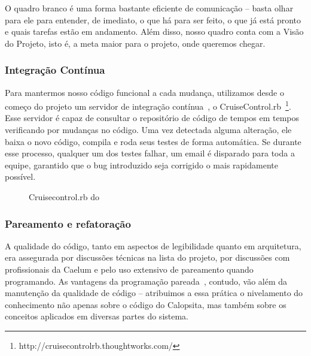 O quadro branco é uma forma bastante eficiente de comunicação -- basta olhar para ele para entender, de imediato, o que há para ser feito, o que já está pronto e quais tarefas estão em andamento. Além disso, nosso quadro conta com a Visão do Projeto, isto é, a meta maior para o projeto, onde queremos chegar.

\subsubsection*{Integração Contínua}

Para mantermos nosso código funcional a cada mudança, utilizamos desde o começo do projeto um servidor de integração contínua~\cite{ci}, o CruiseControl.rb~\footnote{http://cruisecontrolrb.thoughtworks.com/}. Esse servidor é capaz de consultar o repositório de código de tempos em tempos verificando por mudanças no código. Uma vez detectada alguma alteração, ele baixa o novo código, compila e roda seus testes de forma automática. Se durante esse processo, qualquer um dos testes falhar, um email é disparado para toda a equipe, garantido que o bug introduzido seja corrigido o mais rapidamente possível.

\begin{figure}[H]
  \centering
  \caption{Cruisecontrol.rb do \calopsita}
\end{figure}

\subsubsection*{Pareamento e refatoração}

A qualidade do código, tanto em aspectos de legibilidade quanto em arquitetura, era assegurada por discussões técnicas na lista do projeto, por discussões com profissionais da Caelum e pelo uso extensivo de pareamento quando programando. As vantagens da programação pareada~\cite{pair}, contudo, vão além da manutenção da qualidade de código -- atribuimos a essa prática o nivelamento do conhecimento não apenas sobre o código do Calopsita, mas também sobre os conceitos aplicados em diversas partes do sistema.

